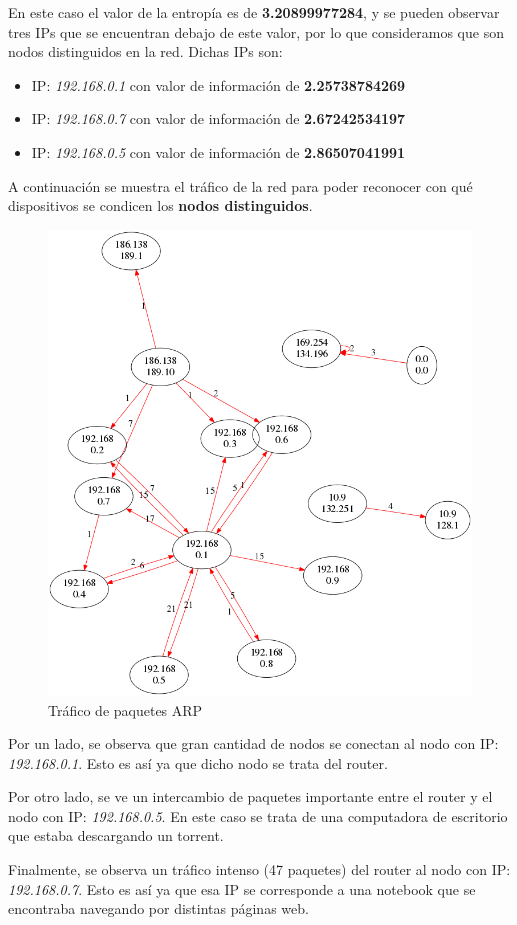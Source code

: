 En este caso el valor de la entropía es de \textbf{3.20899977284}, y se pueden observar tres IPs que se encuentran debajo de este valor, por lo que consideramos que son nodos distinguidos en la red. Dichas IPs son:
\begin{itemize}
\item IP: \textit{192.168.0.1} con valor de información de \textbf{2.25738784269}
\item IP: \textit{192.168.0.7} con valor de información de \textbf{2.67242534197}
\item IP: \textit{192.168.0.5} con valor de información de \textbf{2.86507041991}
\end{itemize}

A continuación se muestra el tráfico de la red para poder reconocer con qué dispositivos se condicen los \textbf{nodos distinguidos}.

\begin{figure}[H]
       \centering
       \includegraphics[width=1\textwidth]{../resultados/Casa/network.png}
       \caption{Tráfico de paquetes ARP}
       \label{red-hogarena-arp-traffic}
\end{figure}

Por un lado, se observa que gran cantidad de nodos se conectan al nodo con IP: \textit{192.168.0.1}. Esto es así ya que dicho nodo se trata del router.

Por otro lado, se ve un intercambio de paquetes importante entre el router y el nodo con IP: \textit{192.168.0.5}. En este caso se trata de una computadora de escritorio que estaba descargando un torrent.

Finalmente, se observa un tráfico intenso (47 paquetes) del router al nodo con IP: \textit{192.168.0.7}. Esto es así ya que esa IP se corresponde a una notebook que se encontraba navegando por distintas páginas web.


